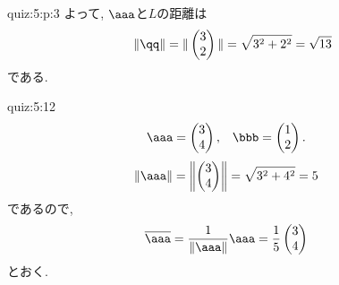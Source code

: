 \begin{answerof}{quiz:5:p:3}
  よって, $\aaa$と$L$の距離は
  \begin{align*}
    \|\qq\|= \|\begin{pmatrix}3\\2\end{pmatrix}\|=\sqrt{3^2+2^2}=\sqrt{13}
  \end{align*}
  である.
\end{answerof}
  
\begin{answerof}{quiz:5:12}
  \begin{align*}
    \aaa&=\begin{pmatrix}3\\4\end{pmatrix},&
    \bbb&=\begin{pmatrix}1\\2\end{pmatrix}.
  \end{align*}
  \begin{align*}
    \|\aaa\|
    &=\left\|\begin{pmatrix}3\\4\end{pmatrix}\right\|
    =\sqrt{3^2+4^2}=5
  \end{align*}
  であるので,
  \begin{align*}
    \overline{\aaa}
    &=\frac{1}{\|\aaa\|}\aaa
    =\frac{1}{5}\begin{pmatrix}3\\4\end{pmatrix}
  \end{align*}
  とおく.


\end{answerof}
